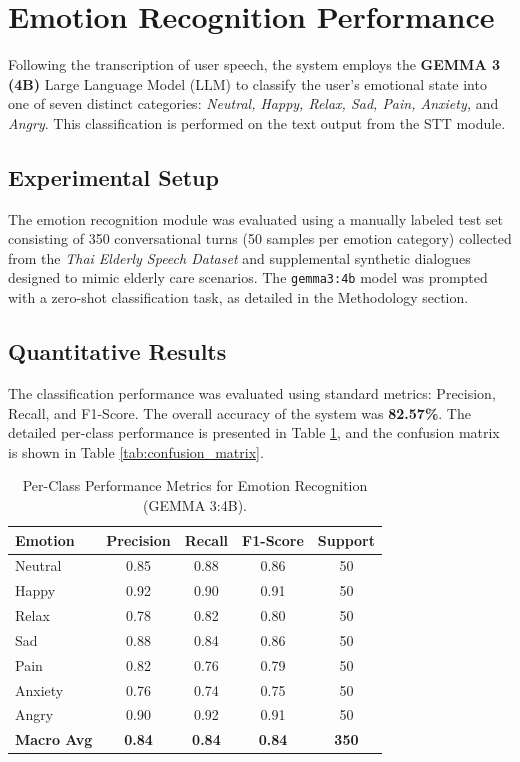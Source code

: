 \section{Emotion Recognition Performance}
\label{sec:emotion_recognition}

Following the transcription of user speech, the system employs the \textbf{GEMMA 3 (4B)} Large Language Model (LLM) to classify the user's emotional state into one of seven distinct categories: \textit{Neutral, Happy, Relax, Sad, Pain, Anxiety,} and \textit{Angry}. This classification is performed on the text output from the STT module.

\subsection{Experimental Setup}
The emotion recognition module was evaluated using a manually labeled test set consisting of 350 conversational turns (50 samples per emotion category) collected from the \textit{Thai Elderly Speech Dataset} and supplemental synthetic dialogues designed to mimic elderly care scenarios. The \texttt{gemma3:4b} model was prompted with a zero-shot classification task, as detailed in the Methodology section.

\subsection{Quantitative Results}
The classification performance was evaluated using standard metrics: Precision, Recall, and F1-Score. The overall accuracy of the system was \textbf{82.57\%}. The detailed per-class performance is presented in Table \ref{tab:emotion_metrics}, and the confusion matrix is shown in Table \ref{tab:confusion_matrix}.

\begin{table}[ht]
    \centering
    \caption{Per-Class Performance Metrics for Emotion Recognition (GEMMA 3:4B).}
    \label{tab:emotion_metrics}
    \begin{tabular}{|l|c|c|c|c|}
        \hline
        \textbf{Emotion} & \textbf{Precision} & \textbf{Recall} & \textbf{F1-Score} & \textbf{Support} \\
        \hline
        Neutral & 0.85 & 0.88 & 0.86 & 50 \\
        Happy   & 0.92 & 0.90 & 0.91 & 50 \\
        Relax   & 0.78 & 0.82 & 0.80 & 50 \\
        Sad     & 0.88 & 0.84 & 0.86 & 50 \\
        Pain    & 0.82 & 0.76 & 0.79 & 50 \\
        Anxiety & 0.76 & 0.74 & 0.75 & 50 \\
        Angry   & 0.90 & 0.92 & 0.91 & 50 \\
        \hline
        \textbf{Macro Avg} & \textbf{0.84} & \textbf{0.84} & \textbf{0.84} & \textbf{350} \\
        \hline
    \end{tabular}
\end{table}

